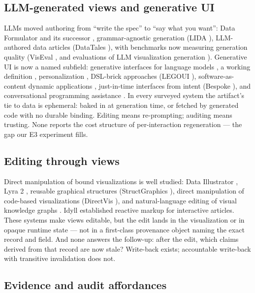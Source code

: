 \documentclass[11pt]{article}
\begin{document}
\subsection{LLM-generated views and generative UI}

LLMs moved authoring from ``write the spec'' to ``say what you want'': Data Formulator
\cite{dataformulator} and its successor \cite{dataformulator2}, grammar-agnostic
generation (LIDA \cite{lida}), LLM-authored data articles (DataTales \cite{datatales}),
with benchmarks now measuring generation quality (VisEval \cite{viseval}, and
evaluations of LLM visualization generation \cite{vizgeneval}). Generative UI is now a
named subfield: generative interfaces for language models \cite{geninterfaces}, a working
definition \cite{guidef}, personalization \cite{guipers}, DSL-brick approaches
(LEGOUI \cite{legoui}), software-as-content dynamic applications \cite{swcontent},
just-in-time interfaces from intent (Bespoke \cite{bespoke}), and conversational
programming assistance \cite{assistant}. In every surveyed system the artifact's tie to
data is ephemeral: baked in at generation time, or fetched by generated code with no
durable binding. Editing means re-prompting; auditing means trusting. None reports the
cost structure of per-interaction regeneration --- the gap our E3 experiment fills.

\subsection{Editing through views}

Direct manipulation of bound visualizations is well studied: Data Illustrator
\cite{dataillustrator}, Lyra 2 \cite{lyra2}, reusable graphical structures
(StructGraphics \cite{structgraphics}), direct manipulation of code-based visualizations
(DirectVis \cite{directvis}), and natural-language editing of visual knowledge graphs
\cite{nlvkg}. Idyll \cite{idyll} established reactive markup for interactive articles.
These systems make views editable, but the edit lands in the visualization or in opaque
runtime state --- not in a first-class provenance object naming the exact record and
field. And none answers the follow-up: after the edit, which claims derived from that
record are now stale? Write-back exists; accountable write-back with transitive
invalidation does not.

\subsection{Evidence and audit affordances}
\end{document}
